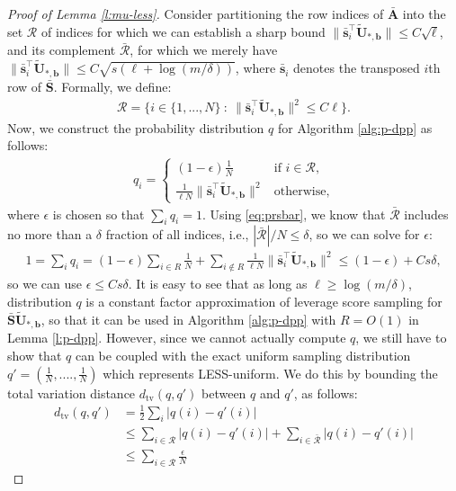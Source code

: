 \documentclass[11pt]{article}
\let\origtop\top
\renewcommand\top{{\scriptscriptstyle{\origtop}}}
\def\ss{{\mathbf s}}
\def\b{{\mathbf b}}
\def\A{{\mathbf A}}
\def\S{{\mathbf S}}
\def\setR{{\mathcal R}}
\def\U{{\mathbf U}}
\begin{document}
\begin{proof}[Proof of Lemma \ref{l:mu-less}]
Consider partitioning the row indices of $\bar\A$ into the set $\setR$ of indices
  for which we can establish a sharp bound
  $\|\bar\ss_i^\top\tilde\U_{*,\b}\| \leq C\sqrt \ell$, 
  and its complement
  $\bar \setR$,
  for which we merely have 
  $\|\bar\ss_i^\top\tilde\U_{*,\b}\|\leq C\sqrt{s(\ell+\log(m/\delta))}$, where $\bar\ss_i$ denotes the transposed $i$th row of $\bar\S$. 
Formally, we define:
  \begin{align*}
    \setR = \Big\{i\in\{1,...,N\} \ :\ \|\bar\ss_i^\top\tilde\U_{*,\b}\|^2\leq C\ell\Big\}.
  \end{align*}
  Now, we construct the probability distribution $q$ for Algorithm \ref{alg:p-dpp} as follows:
\begin{align*}
    q_i =
    \begin{cases}
      (1-\epsilon)\frac1N &\text{if }i\in \setR,\\
      \frac1{\ell N}\|\bar\ss_i^\top\tilde\U_{*,\b}\|^2&\text{otherwise,}
    \end{cases}                                            
  \end{align*}
  where $\epsilon$ is chosen so that $\sum_iq_i=1$. Using \eqref{eq:prsbar}, we know that
  $\bar \setR$ includes no more than a $\delta$ fraction of all
  indices, i.e., $|\bar \setR|/N\leq\delta$, so we can solve for $\epsilon$:
  \begin{align*}
1=\sum_i q_i = (1-\epsilon)\sum_{i\in R}\frac1N + \sum_{i\not\in
    R}\frac1{\ell N}\|\bar\ss_i^\top\tilde\U_{*,\b}\|^2
    \leq (1-\epsilon) + Cs\delta,
  \end{align*}
  so we can use $\epsilon \leq Cs\delta$. 
  It is easy to see that as long as $\ell\geq \log(m/\delta)$, distribution $q$ is a constant factor approximation of leverage score sampling for $\bar\S\tilde\U_{*,\b}$, so that it can be used in Algorithm \ref{alg:p-dpp} with $R=O(1)$ in Lemma \ref{l:p-dpp}. However, since we cannot actually compute $q$, we still have to show that $q$ can be coupled with the exact uniform sampling distribution $q' = (\frac1N,....,\frac1N)$ which represents LESS-uniform. We do this by bounding the total variation distance $d_{\textrm{tv}}(q,q')$ between $q$ and $q'$, as follows:
  \begin{align*}
    d_{\mathrm{tv}}(q,q')
    &= \frac12\sum_i|q(i) - q'(i)|
    \\
    &\leq \sum_{i\in \setR}|q(i) - q'(i)| + \sum_{i\in\bar \setR}|q(i) -
      q'(i)|
    \\
    &\leq \sum_{i\in \setR}\frac{\epsilon}{N}

\end{align*}
\end{proof}
\end{document}
